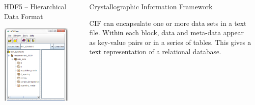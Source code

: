 \documentclass[final]{beamer}
\begin{document}
\begin{frame}{}
\begin{columns}[t]
\begin{column}{.31\linewidth}
\begin{block}{HDF5 -- Hierarchical Data Format}
         \begin{center}
           \includegraphics[width=0.62\linewidth]{hdf5.png}
         \end{center}

         \vspace{10mm} {\ }   \vspace{10mm} {\ }

        \end{block}
      \end{column}
      \begin{column}{.01\linewidth}
      \end{column}
      \begin{column}{.34\linewidth}
        \begin{block}{Crystallographic Information Framework}

          \justifying CIF can encapsulate one or more data sets in a text
          file.  Within each block, data and meta-data appear as key-value
          pairs or in a series of tables.  This gives a text representation
          of a relational database.


\end{block}
\end{column}
\end{columns}
\end{frame}
\end{document}
